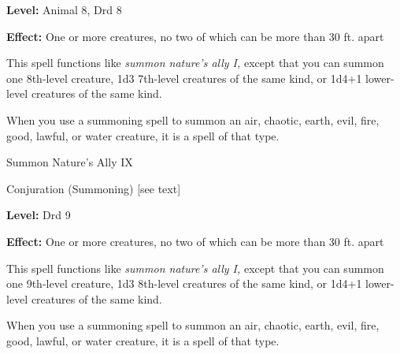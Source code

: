 \documentclass{article}
\begin{document}
\textbf{Level:} Animal 8, Drd 8

\textbf{Effect:} One or more creatures, no two of which can be more than 30 ft. 
apart

This spell functions like \textit{summon nature's ally I, }except that you can 
summon one 8th-level creature, 1d3 7th-level creatures of the same kind, or 1d4+1 
lower-level creatures of the same kind.

When you use a summoning spell to summon an air, chaotic, earth, evil, fire, good, 
lawful, or water creature, it is a spell of that type.

\vspace{12pt}
Summon Nature's Ally IX

Conjuration (Summoning) [see text]

\textbf{Level:} Drd 9

\textbf{Effect:} One or more creatures, no two of which can be more than 30 ft. 
apart

This spell functions like \textit{summon nature's ally I, }except that you can 
summon one 9th-level creature, 1d3 8th-level creatures of the same kind, or 1d4+1 
lower-level creatures of the same kind.

When you use a summoning spell to summon an air, chaotic, earth, evil, fire, good, 
lawful, or water creature, it is a spell of that type.
\end{document}
